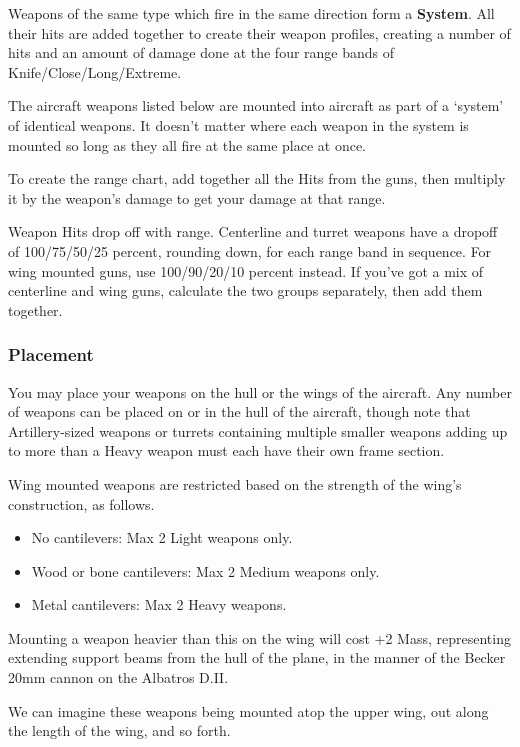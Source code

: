 \documentclass{article}
\begin{document}
Weapons of the same type which fire in the same direction form a
\textbf{System}. All their hits are added together to create their
weapon profiles, creating a number of hits and an amount of damage done
at the four range bands of Knife/Close/Long/Extreme.

The aircraft weapons listed below are mounted into aircraft as part of a
`system' of identical weapons. It doesn't matter where each weapon in
the system is mounted so long as they all fire at the same place at
once.

To create the range chart, add together all the Hits from the guns, then
multiply it by the weapon's damage to get your damage at that range.

Weapon Hits drop off with range. Centerline and turret weapons have a
dropoff of 100/75/50/25 percent, rounding down, for each range band in
sequence. For wing mounted guns, use 100/90/20/10 percent instead. If
you've got a mix of centerline and wing guns, calculate the two groups
separately, then add them together.

\subsubsection{Placement}
\label{_Placement}

You may place your weapons on the hull or the wings of the aircraft. Any
number of weapons can be placed on or in the hull of the aircraft,
though note that Artillery-sized weapons or turrets containing multiple
smaller weapons adding up to more than a Heavy weapon must each have
their own frame section.

Wing mounted weapons are restricted based on the strength of the wing's
construction, as follows.

\begin{itemize}
    \item          No cantilevers: Max 2 Light weapons only.
    \item          Wood or bone cantilevers: Max 2 Medium weapons only.
    \item          Metal cantilevers: Max 2 Heavy weapons.
\end{itemize}

Mounting a weapon heavier than this on the wing will cost +2 Mass,
representing extending support beams from the hull of the plane, in the
manner of the Becker 20mm cannon on the Albatros D.II.

We can imagine these weapons being mounted atop the upper wing, out
along the length of the wing, and so forth.
\end{document}
